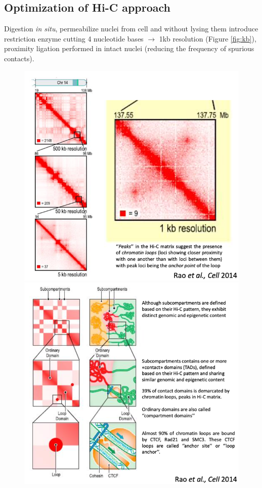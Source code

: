 \hypertarget{optimization-of-hi-c-approach}{%
\subsection{Optimization of Hi-C approach}\label{optimization-of-hi-c-approach}}

Digestion \emph{in situ}, permeabilize nuclei from cell and without lysing them introduce restriction enzyme cutting 4 nucleotide bases $\rightarrow$ 1kb resolution (Figure \ref{fig:kb}), proximity ligation performed in intact nuclei (reducing the frequency of spurious contacts).

\begin{figure}[!htb]
   \begin{minipage}{0.48\textwidth}
     \centering
     \includegraphics[width=0.7\linewidth]{../_resources/Screenshot_2022-10-19_at_09-10-50.png}
     \caption{}\label{fig:kb}
   \end{minipage}\hfill
   \begin{minipage}{0.48\textwidth}
     \centering
     \includegraphics[width=0.7\linewidth]{../_resources/Screenshot_2022-10-19_at_09-11-30.png}
     \caption{}\label{fig:sub}
   \end{minipage}
\end{figure}

